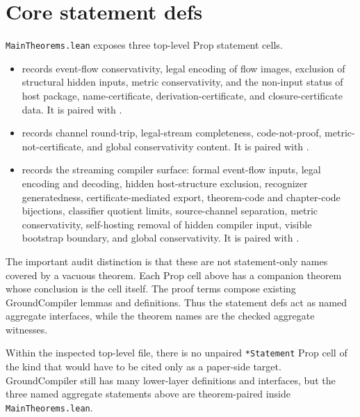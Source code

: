 \section{Core statement defs}
\label{sec:bedc-groundcompiler-audit-map-core-statement-defs}

\texttt{MainTheorems.lean} exposes three top-level Prop statement cells.

\begin{itemize}
\item {}
records event-flow conservativity, legal encoding of flow images, exclusion of
structural hidden inputs, metric conservativity, and the non-input status of
host package, name-certificate, derivation-certificate, and closure-certificate
data. It is paired with
.
\item {}
records channel round-trip, legal-stream completeness, code-not-proof,
metric-not-certificate, and global conservativity content. It is paired with
.
\item {}
records the streaming compiler surface: formal event-flow inputs, legal
encoding and decoding, hidden host-structure exclusion, recognizer
generatedness, certificate-mediated export, theorem-code and chapter-code
bijections, classifier quotient limits, source-channel separation, metric
conservativity, self-hosting removal of hidden compiler input, visible
bootstrap boundary, and global conservativity. It is paired with
.
\end{itemize}

The important audit distinction is that these are not statement-only names
covered by a vacuous theorem. Each Prop cell above has a companion theorem
whose conclusion is the cell itself. The proof terms compose existing
GroundCompiler lemmas and definitions. Thus the statement defs act as named
aggregate interfaces, while the theorem names are the checked aggregate
witnesses.

Within the inspected top-level file, there is no unpaired
\texttt{*Statement} Prop cell of the kind that would have to be cited only as a
paper-side target. GroundCompiler still has many lower-layer definitions and
interfaces, but the three named aggregate statements above are theorem-paired
inside \texttt{MainTheorems.lean}.


